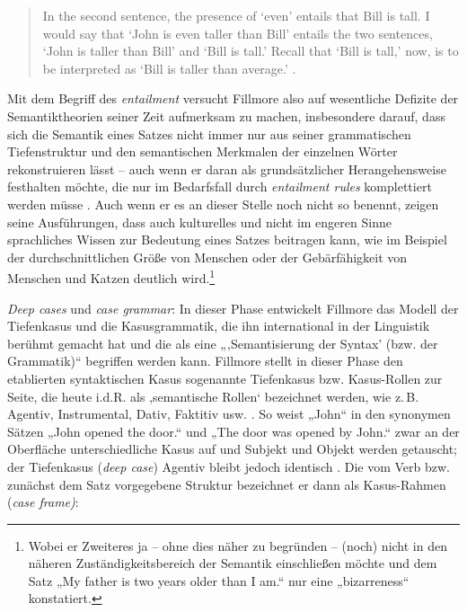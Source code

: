 \begin{quote}
In the second sentence, the presence of `even' entails that Bill is tall. I would say that `John is even taller than Bill' entails the two sentences, `John is taller than Bill' and `Bill is tall.' Recall that `Bill is tall,' now, is to be interpreted as `Bill is taller than average.' \autocite[68]{fillmoreEntailmentRulesSemantic1965}.
\end{quote}

Mit dem Begriff des \emph{entailment} versucht Fillmore also auf wesentliche Defizite der Semantiktheorien seiner Zeit aufmerksam zu machen, insbesondere darauf, dass sich die Semantik eines Satzes nicht immer nur aus seiner grammatischen Tiefenstruktur und den semantischen Merkmalen der einzelnen Wörter rekonstruieren lässt -- auch wenn er daran als grundsätzlicher Herangehensweise festhalten möchte, die nur im Bedarfsfall durch \emph{entailment rules} komplettiert werden müsse \autocite[82]{fillmoreEntailmentRulesSemantic1965}. Auch wenn er es an dieser Stelle noch nicht so benennt, zeigen seine Ausführungen, dass auch kulturelles und nicht im engeren Sinne sprachliches Wissen zur Bedeutung eines Satzes beitragen kann, wie im Beispiel der durchschnittlichen Größe von Menschen oder der Gebärfähigkeit von Menschen und Katzen deutlich wird.\footnote{Wobei er Zweiteres ja -- ohne dies näher zu begründen -- (noch) nicht in den näheren Zuständigkeitsbereich der Semantik einschließen möchte und dem Satz „My father is two years older than I am.`` nur eine „bizarreness`` \autocite[64]{fillmoreEntailmentRulesSemantic1965} konstatiert.}

\emph{Deep cases} und \emph{case grammar}: In dieser Phase entwickelt Fillmore das Modell der Tiefenkasus und die Kasusgrammatik, die ihn international in der Linguistik berühmt gemacht hat und die als eine „‚Semantisierung der Syntax' (bzw. der Grammatik)`` \autocite[34]{busseFrameSemantikKompendium2012} begriffen werden kann. Fillmore stellt in dieser Phase den etablierten syntaktischen Kasus sogenannte Tiefenkasus bzw. Kasus-Rollen zur Seite, die heute i.d.R. als ‚semantische Rollen` bezeichnet werden, wie z.\,B. Agentiv, Instrumental, Dativ, Faktitiv usw. \autocite[24-25]{fillmoreCaseCase1968}. So weist „John`` in den synonymen Sätzen „John opened the door.`` und „The door was opened by John.`` zwar an der Oberfläche unterschiedliche Kasus auf und Subjekt und Objekt werden getauscht; der Tiefenkasus (\emph{deep case}) Agentiv bleibt jedoch identisch \autocite[25]{fillmoreCaseCase1968}. Die vom Verb bzw. zunächst dem Satz vorgegebene Struktur bezeichnet er dann als Kasus-Rahmen (\emph{case frame)}:

